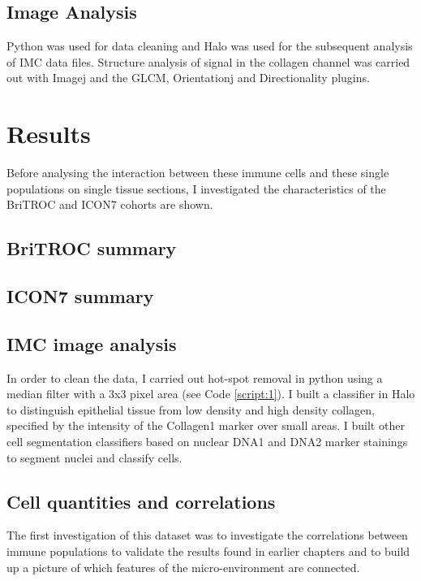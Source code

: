 \subsection{Image Analysis}
Python was used for data cleaning and Halo was used for the subsequent analysis of IMC data files. Structure analysis of signal in the collagen channel was carried out with Imagej and the GLCM, Orientationj and Directionality plugins. 


\section{Results}
Before analysing the interaction between these immune cells and these single populations on single tissue sections, I investigated the characteristics of the BriTROC and ICON7 cohorts are shown.

\subsection{BriTROC summary}
\subsection{ICON7 summary}

\subsection{IMC image analysis}
 In order to clean the data, I carried out hot-spot removal in python using a median filter with a 3x3 pixel area (see Code \ref{script:1}).
 I built a classifier in Halo to distinguish epithelial tissue from low density and high density collagen, specified by the intensity of the Collagen1 marker over small areas.
 I built other cell segmentation classifiers based on nuclear DNA1 and DNA2 marker stainings to segment nuclei and classify cells. 

\subsection{Cell quantities and correlations}

The first investigation of this dataset was to investigate the correlations between immune populations to validate the results found in earlier chapters and to build up a picture of which features of the micro-environment are connected.

